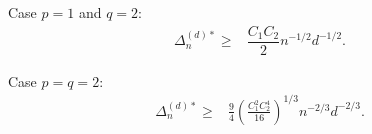 Case $p=1$ and $q=2$:
\begin{align*}
\Delta_n^{(d)*}  \ge& \dfrac{C_1 C_2}{2} n^{-1/2} d^{-1/2}.
\end{align*}

Case $p=q=2$:
\begin{align*}
\Delta_n^{(d)*}  \ge& \frac{9}{4}\left(\frac{C_1^2 C_2^4}{16}\right)^{1/3} n^{-2/3} d^{-2/3}.
\end{align*}